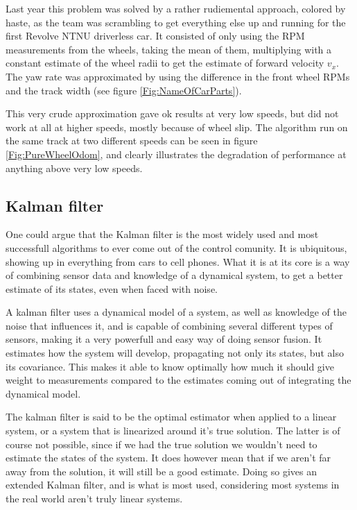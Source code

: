 Last year this problem was solved by a rather rudiemental approach, colored by haste, as the team was scrambling to get everything else up and running for the first Revolve NTNU driverless car. It consisted of only using the RPM measurements from the wheels, taking the mean of them, multiplying with a constant estimate of the wheel radii to get the estimate of forward velocity $v_x$. The yaw rate was approximated by using the difference in the front wheel RPMs and the track width (see figure \ref{Fig:NameOfCarParts}).  

This very crude approximation gave ok results at very low speeds, but did not work at all at higher speeds, mostly because of wheel slip. The algorithm run on the same track at two different speeds can be seen in figure \ref{Fig:PureWheelOdom}, and clearly illustrates the degradation of performance at anything above very low speeds.   

\subsection{Kalman filter}

One could argue that the Kalman filter is the most widely used and most successfull algorithms to ever come out of the control comunity. It is ubiquitous, showing up in everything from cars to cell phones. What it is at its core is a way of combining sensor data and knowledge of a dynamical system, to get a better estimate of its states, even when faced with noise. 

A kalman filter uses a dynamical model of a system, as well as knowledge of the noise that influences it, and is capable of combining several different types of sensors, making it a very powerfull and easy way of doing sensor fusion. It estimates how the system will develop, propagating not only its states, but also its covariance. This makes it able to know optimally how much it should give weight to measurements compared to the estimates coming out of integrating the dynamical model. 

The kalman filter is said to be the optimal estimator when applied to a linear system, or a system that is linearized around it's true solution. The latter is of course not possible, since if we had the true solution we wouldn't need to estimate the states of the system. It does however mean that if we aren't far away from the solution, it will still be a good estimate. Doing so gives an extended Kalman filter\cite{EKF}, and is what is most used, considering most systems in the real world aren't truly linear systems.  

